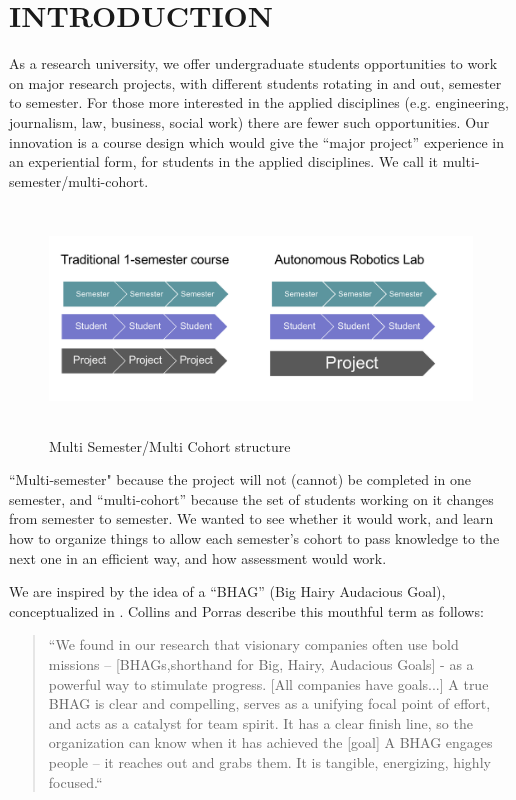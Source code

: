 \section{INTRODUCTION}

As a research university, we offer undergraduate students opportunities to work on major research projects, with different students rotating in and out, semester to semester. For those more interested in the applied disciplines (e.g. engineering, journalism, law, business, social work) there are fewer such opportunities. Our innovation is a course design which would give the “major project” experience in an experiential form, for students in the applied disciplines. We call it multi-semester/multi-cohort. 

\begin{figure}[!h]
  \centering
  \includegraphics[width=\columnwidth,height=6cm]{diag1}
  \caption{Multi Semester/Multi Cohort structure}
  \label{fig:diag1}
\end{figure}

``Multi-semester" because the project will not (cannot) be completed in one semester, and “multi-cohort” because the set of students working on it changes from semester to semester. We wanted to see whether it would work, and learn how to organize things to allow each semester’s cohort to pass knowledge to the next one in an efficient way, and how assessment would work.


We are inspired by the idea of a “BHAG” (Big Hairy Audacious Goal), conceptualized in \cite{Collins}. Collins and Porras describe this mouthful term as follows:

\begin{quote}
``We found in our research that visionary companies often use bold missions – [BHAGs,shorthand for Big, Hairy, Audacious Goals] - as a powerful way to stimulate progress. [All companies have goals...] A true BHAG is clear and compelling, serves as a unifying focal point of effort, and acts as a catalyst for team spirit. It has a clear finish line, so the organization can know when it has achieved the [goal] A BHAG engages people – it reaches out and grabs them. It is tangible, energizing, highly focused.``\cite{Collins}
\end{quote}

